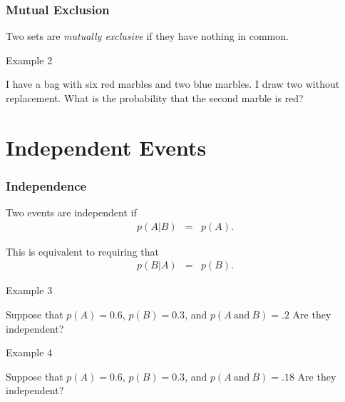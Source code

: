 \begin{frame}
  \frametitle{Mutual Exclusion}

  \begin{definition}
    Two sets are \textit{mutually exclusive} if they have nothing in
    common.
  \end{definition}

\end{frame}


\begin{frame}{Example 2}
  
  I have a bag with six red marbles and two blue marbles. I draw two
  without replacement. What is the probability that the second marble
  is red?

  \vfill

\end{frame}

\section{Independent Events}

\begin{frame}
  \frametitle{Independence}

  \begin{definition}
    Two events are independent if 
    \begin{eqnarray*}
      p(A|B) & = & p(A).
    \end{eqnarray*}

    This is equivalent to requiring that
    \begin{eqnarray*}
      p(B|A) & = & p(B).
    \end{eqnarray*}

  \end{definition}

\end{frame}



\begin{frame}{Example 3}

  Suppose that $p(A)=0.6$, $p(B)=0.3$, and $p(A\mathrm{~and~}B)=.2$
  Are they independent?

  \vfill

  
\end{frame}



\begin{frame}{Example 4}

  Suppose that $p(A)=0.6$, $p(B)=0.3$, and $p(A\mathrm{~and~}B)=.18$
  Are they independent?

  \vfill

  
\end{frame}


